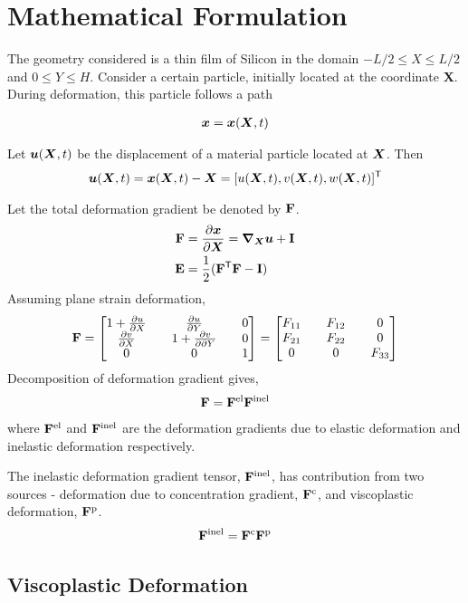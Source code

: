 \documentclass[../main.tex]{subfiles}
\begin{document}
\section{Mathematical Formulation}
The geometry considered is a thin film of Silicon in the domain $ -L/2 \le X \le L/2$ and $0 \le Y \le H$. Consider a certain particle, initially located at the coordinate \textbf{X}. During deformation, this particle follows a path 


\begin{gather}
{\bm{x}} = {\bm{x}}({\bm{X}},t)
\end{gather}

\vspace{0.25cm}
Let ${\bm{u}}({\bm{X}}, t)$ be the displacement of a material particle located at ${\bm{X}}$. Then
\begin{align}
    {\bm{u}}({\bm{X}}, t) = {\bm{x}}({\bm{X}}, t) - {\bm{X}} = [u({\bm{X}}, t), v({\bm{X}}, t), w({\bm{X}}, t)]^{{\sf {T}}}
\end{align}

Let the total deformation gradient be denoted by $\mathbf{F}$.
\begin{align}
    \mathbf{F} &= \frac{\partial {\bm{x}}}{\partial {\bm{X}}} = \bm{\nabla}_{\bm{X}} {\bm{u}} + \mathbf{I} \\
    \mathbf{E} &= \frac{1}{2}(\mathbf{F}^{\sf {T}} \mathbf{F} - \mathbf{I})
\end{align}
Assuming plane strain deformation, 
\begin{align}
\mathbf{F} = 
\begin{bmatrix}
       1 + \frac{\partial u}{\partial X} && \frac{\partial u}{\partial Y} && 0 \\
       \frac{\partial v}{\partial X} && 1 + \frac{\partial v}{\partial \partial Y} && 0 \\
       0 && 0 && 1
\end{bmatrix} = \begin{bmatrix} F_{11} && F_{12} && 0 \\ F_{21} && F_{22} && 0 \\ 0 && 0 && F_{33} \end{bmatrix}
\end{align}
Decomposition of deformation gradient gives, 
\begin{gather}
\mathbf{F} = \mathbf{F}^{{\rm{el}}} \mathbf{F}^{{\rm{inel}}}
\end{gather}
where $\mathbf{F}^{{\rm{el}}}$ and $\mathbf{F}^{{\rm{inel}}}$ are the deformation gradients due to elastic deformation and inelastic deformation respectively.

The inelastic deformation gradient tensor, $\mathbf{F}^{{\rm{inel}}}$, has contribution from two sources - deformation due to concentration gradient, $\mathbf{F}^{\rm{c}}$, and viscoplastic deformation, $\mathbf{F}^{\rm{p}}$.
\begin{align}
    \mathbf{F}^{\rm{inel}} = \mathbf{F}^{\rm{c}} \mathbf{F}^{\rm{p}}
\end{align}


\subsection{Viscoplastic Deformation}
\end{document}
